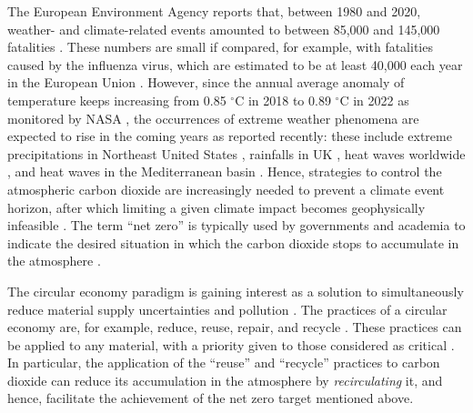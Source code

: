 \documentclass[lettersize,journal]{IEEEtran}
\begin{document}
The European Environment Agency reports that, between 1980 and 2020, weather- and climate-related events amounted to between 85,000 and 145,000 fatalities \cite{EEA}. These numbers are small if compared, for example, with fatalities caused by the influenza virus, which are estimated to be at least 40,000 each year in the European Union \cite{ECDCreport}. However, since the annual average anomaly of temperature keeps increasing from 0.85 $^\circ$C in 2018 to 0.89 $^\circ$C in 2022 as monitored by NASA \cite{NASAanomaly}, the occurrences of extreme weather phenomena are expected to rise in the coming years as reported recently: these include extreme precipitations in Northeast United States \cite{jong2023increases}, rainfalls in UK \cite{kendon2023variability}, heat waves worldwide \cite{perkins2020increasing}, and heat waves in the Mediterranean basin \cite{molina2020future}. Hence, strategies to control the atmospheric carbon dioxide are increasingly needed to prevent a climate event horizon, after which limiting a given climate impact becomes geophysically infeasible \cite{aengenheyster2018point}. The term ``net zero'' is typically used by governments and academia to indicate the desired situation in which the carbon dioxide stops to accumulate in the atmosphere \cite{NZdefinition,EU-netZero}.    

The circular economy paradigm is gaining interest as a solution to simultaneously reduce material supply uncertainties and pollution \cite{UN-CE,EU-CE,US-CE}. The practices of a circular economy are, for example, reduce, reuse, repair, and recycle \cite{potting2017circular}. These practices can be applied to any material, with a priority given to those considered as critical \cite{GAUSTAD201824,CRMs-EU}. In particular, the application of the ``reuse'' and ``recycle'' practices to carbon dioxide can reduce its accumulation in the atmosphere by \emph{recirculating} it, and hence, facilitate the achievement of the net zero target mentioned above.         
        
\end{document}
